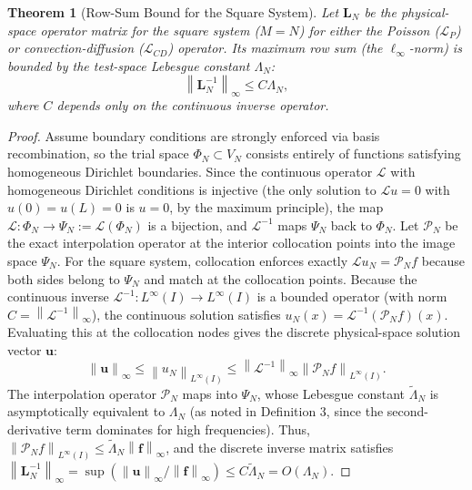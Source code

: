 \documentclass[pdflatex,sn-mathphys-num]{sn-jnl}%
\theoremstyle{thmstyleone}%
\newtheorem{theorem}{Theorem}
\newcommand{\norm}[1]{\left\lVert#1\right\rVert}
\newcommand{\mat}[1]{\mathbf{#1}}
\newcommand{\vect}[1]{\mathbf{#1}}
\begin{document}
\begin{theorem}[Row-Sum Bound for the Square System]
\label{thm:square_system_decay}
Let $\mat{L}_N$ be the physical-space operator matrix for the square system ($M=N$) for either the Poisson ($\mathcal{L}_P$) or convection-diffusion ($\mathcal{L}_{CD}$) operator. Its maximum row sum (the $\ell_\infty$-norm) is bounded by the test-space Lebesgue constant $\Lambda_N$:
\begin{equation} \norm{\mat{L}_N^{-1}}_\infty \le C \Lambda_N, \end{equation}
where $C$ depends only on the continuous inverse operator.
\end{theorem}
\begin{proof}
Assume boundary conditions are strongly enforced via basis recombination, so the trial space $\Phi_N \subset V_N$ consists entirely of functions satisfying homogeneous Dirichlet boundaries. Since the continuous operator $\mathcal{L}$ with homogeneous Dirichlet conditions is injective (the only solution to $\mathcal{L}u = 0$ with $u(0)=u(L)=0$ is $u=0$, by the maximum principle), the map $\mathcal{L}: \Phi_N \to \Psi_N := \mathcal{L}(\Phi_N)$ is a bijection, and $\mathcal{L}^{-1}$ maps $\Psi_N$ back to $\Phi_N$. Let $\mathcal{P}_N$ be the exact interpolation operator at the interior collocation points into the image space $\Psi_N$. For the square system, collocation enforces exactly $\mathcal{L} u_N = \mathcal{P}_N f$ because both sides belong to $\Psi_N$ and match at the collocation points. Because the continuous inverse $\mathcal{L}^{-1}: L^\infty(I) \to L^\infty(I)$ is a bounded operator (with norm $C = \norm{\mathcal{L}^{-1}}_\infty$), the continuous solution satisfies $u_N(x) = \mathcal{L}^{-1}(\mathcal{P}_N f)(x)$.
Evaluating this at the collocation nodes gives the discrete physical-space solution vector $\vect{u}$:
\begin{equation} \norm{\vect{u}}_\infty \le \norm{u_N}_{L^\infty(I)} \le \norm{\mathcal{L}^{-1}}_\infty \norm{\mathcal{P}_N f}_{L^\infty(I)}. \end{equation}
The interpolation operator $\mathcal{P}_N$ maps into $\Psi_N$, whose Lebesgue constant $\tilde{\Lambda}_N$ is asymptotically equivalent to $\Lambda_N$ (as noted in Definition 3, since the second-derivative term dominates for high frequencies). Thus, $\norm{\mathcal{P}_N f}_{L^\infty(I)} \le \tilde{\Lambda}_N \norm{\vect{f}}_\infty$, and the discrete inverse matrix satisfies $\norm{\mat{L}_N^{-1}}_\infty = \sup (\norm{\vect{u}}_\infty / \norm{\vect{f}}_\infty) \le C \tilde{\Lambda}_N = O(\Lambda_N)$.
\end{proof}
\end{document}
